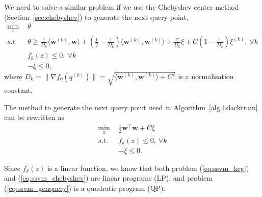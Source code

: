 \documentclass[9pt]{extarticle}
\begin{document}
We need to solve a similar problem if we use the Chebyshev center method (Section~\ref{sec:chebyshev}) to generate the next query point,
\begin{equation}
\label{eq:ssvm_chebyshev}
\begin{aligned}
\min_{z} ~& \theta \\
s.t.~~ ~& \theta \ge 
          \frac{1}{D_k} \langle \mathbf{w}^{(k)}, \mathbf{w} \rangle + 
          (\frac{1}{2} - \frac{1}{D_k}) \langle \mathbf{w}^{(k)}, \mathbf{w}^{(k)} \rangle + 
          \frac{C}{D_k}\xi + C (1 - \frac{1}{D_k}) \xi^{(k)},~ \forall k \\
        & f_k(z) \le 0,~ \forall k \\
        & -\xi \le 0,
\end{aligned}
\end{equation}
where $D_k = \|\nabla f_0(q^{(k)})\| = \sqrt{\langle \mathbf{w}^{(k)}, \mathbf{w}^{(k)} \rangle + C^2}$ is a normalisation constant.


The method to generate the next query point used in Algorithm~\ref{alg:1slacktrain} can be rewritten as
\begin{equation}
\label{eq:ssvm_genquery}
\begin{aligned}
\min_{z} ~& \frac{1}{2} \mathbf{w}^\top \mathbf{w} + C \xi \\
s.t.~~ ~& f_k(z) \le 0,~ \forall k \\
        & -\xi \le 0.
\end{aligned}
\end{equation}


Since $f_k(z)$ is a linear function, we know that both problem (\ref{eq:ssvm_kcg}) and (\ref{eq:ssvm_chebyshev}) are linear programs (LP),
and problem (\ref{eq:ssvm_genquery}) is a quadratic program (QP). 



\end{document}
